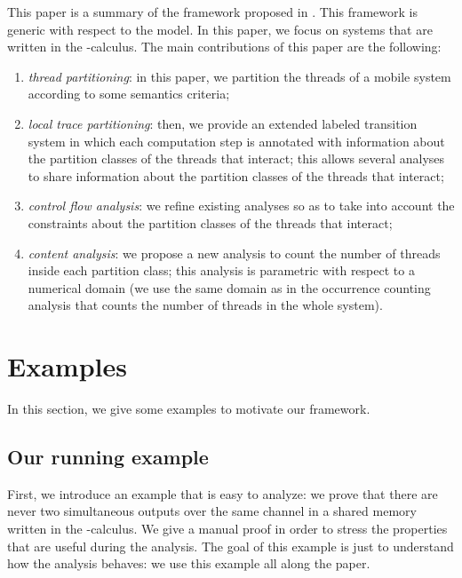 \documentclass{article}
\newcommand{\picalcul}{-calculus}
\begin{document}
This paper is a summary of the framework proposed in \cite[Chap.~10]{feret:thesis}. This framework is generic with respect to the model. In this paper,  we focus on systems that are written in the -calculus. The main contributions of this paper are the following:
\begin{enumerate}
\item \emph{thread partitioning}: in this paper, we partition the threads of a mobile system according to some semantics criteria;
\item \emph{local trace partitioning}: then, we provide an extended labeled transition system in which each  computation step is annotated with information about the partition classes of the threads that interact; this  allows several analyses to share information about the partition classes of the threads that interact;
\item \emph{control flow analysis}: we refine existing analyses \cite{feret:sas2000,feret:esop2002,feret:jlap,feret:thesis} so as to take into account the constraints about the partition classes of the threads that interact;
\item \emph{content analysis}: we propose a new analysis to count the number of threads inside each partition class; this analysis is parametric with respect to a numerical domain (we use the same domain as in the occurrence counting analysis \cite{feret:getco2000,feret:jlap,feret:thesis} that counts the number of threads in the whole system).
\end{enumerate}

\section{Examples}
\label{examples}

In this section, we give some examples to motivate our framework. 

\subsection{Our running example}

First, we introduce an example that is easy to analyze: we  prove that there are never two simultaneous outputs over the same channel in a shared memory written in the \picalcul.  We give a manual proof in order to stress the  properties that are useful during the analysis. The goal of this example is just to understand how the analysis behaves: we use this example all along the paper. 
\end{document}
